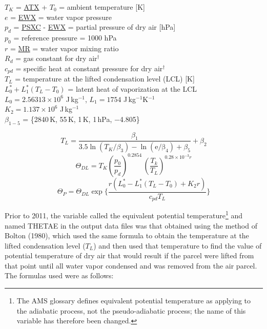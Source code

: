 \documentclass[
]{book}
\begin{document}
\(T_K\) = \protect\hyperlink{ambient-t}{ATX} + \(T_0\) = ambient temperature {[}K{]}\\
\(e\) = \protect\hyperlink{ewx}{EWX} = water vapor pressure\\
\(p_d\) = \protect\hyperlink{psx}{PSXC} - \protect\hyperlink{ewx}{EWX} = partial pressure of dry air {[}hPa{]}\\
\(p_{0}\) = reference pressure = 1000 hPa\\
\(r\) = \protect\hyperlink{MR}{MR} = water vapor mixing ratio\\
\(R_{d}\) = gas constant for dry air\(^{\dagger}\)\\
\(c_{pd}\) = specific heat at constant pressure for dry air\(^{\dagger}\)\\
\(T_L\) = temperature at the lifted condensation level (LCL) {[}K{]}\\
\(L_0^*+L_1^*(T_L-T_0)\) = latent heat of vaporization at the LCL\\
\(L_0=2.56313 × 10^6\) J\(\,\)kg\(^{-1}\), \(L_1=1754\) J\(\,\)kg\(^{-1}\)K\(^{-1}\)\\
\(K_2=1.137 × 10^6\) J\(\,\)kg\(^{-1}\)\\
\(\beta_{1-5}\) = \{2840 K, 55 K, 1 K, 1 hPa, −4.805\}

\begin{equation}
T_{L}=\frac{\beta_{1}}{3.5\ln(T_{K}/\beta_{3})-\ln(\mathrm{e/\beta_{4}})+\beta_{5}}+\beta_{2}
\label{eq:TLCLTP}
\end{equation}
\begin{equation}
\Theta_{DL}=T_{K}(\frac{p_{0}}{p_{d}})^{0.2854}\,(\frac{T_{k}}{T_{L}})^{0.28\times10^{-3}r}
\label{eq:THETADLbox}
\end{equation}
\begin{equation}
\Theta_{P}=\Theta_{DL}\exp\{\frac{r(L_{0}^{*}-L_{1}^{*}(T_{L}-T_{0})+K_{2}r)}{c_{pd}T_{L}}\}
\label{eq:THETAPbox}
\end{equation}

Prior to 2011, the variable called the equivalent potential temperature\footnote{The AMS glossary defines equivalent potential temperature as applying to the adiabatic process, not the pseudo-adiabatic process; the name of this variable has therefore been changed.}
and named THETAE in the output data files was that obtained using the method of Bolton (1980), which used the same formula to obtain the temperature at the lifted condensation level (\(T_L\)) and then used that temperature to find the value of potential temperature of dry air that would result if the parcel were lifted from that point until all water vapor condensed and was removed from the air parcel. The formulas used were as follows:
\end{document}
